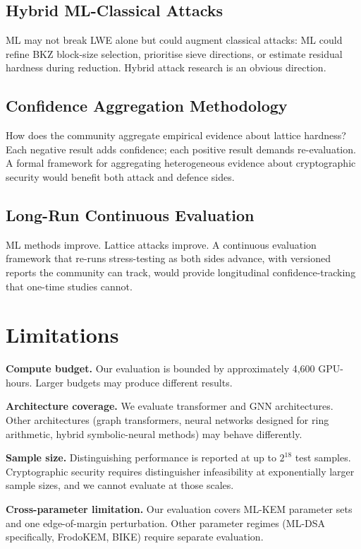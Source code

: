 \documentclass[sigconf,nonacm]{acmart}
\begin{document}
\subsection{Hybrid ML-Classical Attacks}

ML may not break LWE alone but could augment classical attacks: ML
could refine BKZ block-size selection, prioritise sieve directions,
or estimate residual hardness during reduction. Hybrid attack
research is an obvious direction.

\subsection{Confidence Aggregation Methodology}

How does the community aggregate empirical evidence about lattice
hardness? Each negative result adds confidence; each positive result
demands re-evaluation. A formal framework for aggregating
heterogeneous evidence about cryptographic security would benefit
both attack and defence sides.

\subsection{Long-Run Continuous Evaluation}

ML methods improve. Lattice attacks improve. A continuous evaluation
framework that re-runs stress-testing as both sides advance, with
versioned reports the community can track, would provide
longitudinal confidence-tracking that one-time studies cannot.

\section{Limitations}

\textbf{Compute budget.} Our evaluation is bounded by approximately
4{,}600 GPU-hours. Larger budgets may produce different results.

\textbf{Architecture coverage.} We evaluate transformer and GNN
architectures. Other architectures (graph transformers, neural
networks designed for ring arithmetic, hybrid symbolic-neural
methods) may behave differently.

\textbf{Sample size.} Distinguishing performance is reported at up
to $2^{18}$ test samples. Cryptographic security requires
distinguisher infeasibility at exponentially larger sample sizes,
and we cannot evaluate at those scales.

\textbf{Cross-parameter limitation.} Our evaluation covers ML-KEM
parameter sets and one edge-of-margin perturbation. Other
parameter regimes (ML-DSA specifically, FrodoKEM, BIKE) require
separate evaluation.
\end{document}
